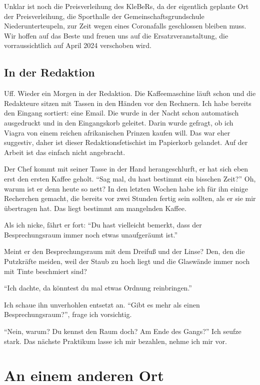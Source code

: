 \documentclass[final]{multiversum}
\begin{document}
Unklar ist noch die Preisverleihung des KleBeRs, da der eigentlich geplante Ort der Preisverleihung, die Sporthalle der Gemeinschaftsgrundschule Niederunterteupeln, zur Zeit wegen eines Coronafalls geschlossen bleiben muss.
Wir hoffen auf das Beste und freuen uns auf die Ersatzveranstaltung, die vorraussichtlich auf April 2024 verschoben wird.

\subsection{In der Redaktion}
Uff. Wieder ein Morgen in der Redaktion.
Die Kaffeemaschine läuft schon und die Redakteure sitzen mit Tassen in den Händen vor den Rechnern.
Ich habe bereits den Eingang sortiert: eine Email.
Die wurde in der Nacht schon automatisch ausgedruckt und in den Eingangskorb geleitet.
Darin wurde gefragt, ob ich Viagra von einem reichen afrikanischen Prinzen kaufen will.
Das war eher suggestiv, daher ist dieser Redaktionsfetischist im Papierkorb gelandet.
Auf der Arbeit ist das einfach nicht angebracht.

Der Chef kommt mit seiner Tasse in der Hand herangeschlurft, er hat sich eben erst den ersten Kaffee geholt.
\enquote{Sag mal, du hast bestimmt ein bisschen Zeit?}
Oh, warum ist er denn heute so nett?
In den letzten Wochen habe ich für ihn einige Recherchen gemacht, die bereits vor zwei Stunden fertig sein sollten, als er sie mir übertragen hat.
Das liegt bestimmt am mangelnden Kaffee.

Als ich nicke, fährt er fort:
\enquote{Du hast vielleicht bemerkt, dass der Besprechungsraum immer noch etwas unaufgeräumt ist.}

Meint er den Besprechungsraum mit dem Dreifuß und der Linse?
Den, den die Putzkräfte meiden, weil der Staub zu hoch liegt und die Glaswände immer noch mit Tinte beschmiert sind?

 \enquote{Ich dachte, da könntest du mal etwas Ordnung reinbringen.}

 Ich schaue ihn unverhohlen entsetzt an.
 \enquote{Gibt es mehr als einen Besprechungsraum?}, frage ich vorsichtig.

 \enquote{Nein, warum? Du kennst den Raum doch? Am Ende des Gangs?}
 Ich seufze stark.
 Das nächste Praktikum lasse ich mir bezahlen, nehme ich mir vor.

\pagebreak
\section{An einem anderen Ort}
\end{document}
